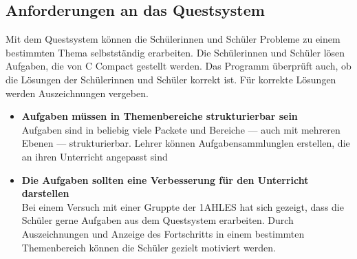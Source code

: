 \subsection*{Anforderungen an das Questsystem}
Mit dem Questsystem können die Schülerinnen und Schüler Probleme zu einem bestimmten Thema selbstständig erarbeiten. Die Schülerinnen und Schüler lösen Aufgaben, die von C Compact gestellt werden. Das Programm überprüft auch, ob die Lösungen der Schülerinnen und Schüler korrekt ist. Für korrekte Lösungen werden Auszeichnungen vergeben.
\begin{itemize}
\item \textbf{Aufgaben müssen in Themenbereiche strukturierbar sein}\\
Aufgaben sind in beliebig viele Packete und Bereiche --- auch mit mehreren Ebenen --- strukturierbar. Lehrer können Aufgabensammlunglen erstellen, die an ihren Unterricht angepasst sind
\item \textbf{Die Aufgaben sollten eine Verbesserung für den Unterricht darstellen}\\
Bei einem Versuch mit einer Gruppte der 1AHLES hat sich gezeigt, dass die Schüler gerne Aufgaben aus dem Questsystem erarbeiten. Durch Auszeichnungen und Anzeige des Fortschritts in einem bestimmten Themenbereich können die Schüler gezielt motiviert werden.
\end{itemize}